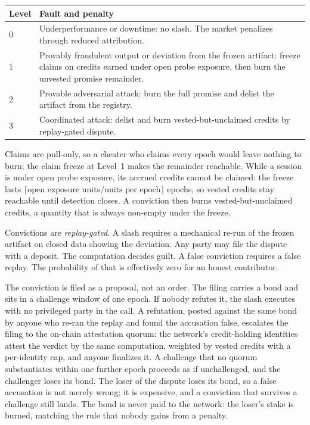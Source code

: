 \documentclass[11pt]{article}
\begin{document}
\begin{center}
    \begin{tabular}{@{}p{3.4cm}p{7.6cm}@{}}
        \toprule
        \textbf{Level} & \textbf{Fault and penalty}                                    \\
        \midrule
        0              & Underperformance or downtime: no slash. The market penalizes
        through reduced attribution.                                                   \\
        1              & Provably fraudulent output or deviation from the frozen
        artifact: freeze claims on credits earned under open probe
        exposure, then burn the unvested promise remainder.                            \\
        2              & Provable adversarial attack: burn the full promise and delist
        the artifact from the registry.                                                \\
        3              & Coordinated attack: delist and burn vested-but-unclaimed
        credits by replay-gated dispute.                                               \\
        \bottomrule
    \end{tabular}
\end{center}

Claims are pull-only, so a
cheater who claims every epoch would leave nothing to burn; the
claim freeze at Level~1 makes the remainder reachable. While a
session is under open probe exposure, its accrued credits cannot
be claimed: the freeze lasts
$\lceil \text{open exposure units} / \text{units per epoch}
    \rceil$ epochs, so vested credits stay reachable until detection
closes. A conviction then burns vested-but-unclaimed credits,
a quantity that is always non-empty under the freeze.

Convictions are \emph{replay-gated}. A slash requires a mechanical
re-run of the frozen artifact on closed data showing the
deviation. Any party may file the dispute with a deposit. The
computation decides guilt. A false conviction requires a false
replay. The probability of that is effectively zero for an honest
contributor.

The conviction is filed as a proposal, not an order. The filing
carries a bond and sits in a challenge window of one epoch. If
nobody refutes it, the slash executes with no privileged party in
the call. A refutation, posted against the same bond by
anyone who re-ran the replay and found the accusation false,
escalates the filing to the on-chain attestation quorum: the
network's credit-holding identities attest the verdict by the
same computation, weighted by vested credits with a per-identity
cap, and anyone finalizes it. A challenge that no quorum
substantiates within one further epoch proceeds as if
unchallenged, and the challenger loses its bond. The loser of
the dispute loses its bond, so a false accusation is not merely
wrong; it is expensive, and a conviction that survives a
challenge still lands. The bond is
never paid to the network: the loser's stake is burned, matching
the rule that nobody gains from a penalty.
\end{document}
